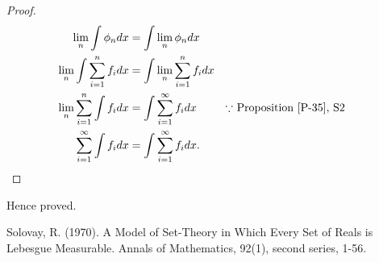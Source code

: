 \documentclass{article}
\theoremstyle{definition}
\theoremstyle{remark}
\theoremstyle{definition}
\theoremstyle{definition}
\theoremstyle{definition}
\begin{document}
\begin{proof}
	\begin{align*}
		\lim_n \int \phi_n dx &= \int \lim_{n}\phi_n dx\\
		\lim_{n} \int \sum_{i=1}^{n} f_i dx&= \int \lim_{n} \sum_{i=1}^{n} f_i dx\\
		\lim_{n}\sum_{i=1}^{n}\int f_i dx &= \int \sum_{i=1}^{\infty} f_i dx&&\text{$ \because $ Proposition \ref{P-35}, S2 }\\
		\sum_{i=1}^{\infty} \int f_i dx &= \int \sum_{i=1}^{\infty} f_i dx.
	\end{align*}
\end{proof}
Hence proved.

\hrulefill

\newpage
\begin{thebibliography}{9}
	Solovay, R. (1970). A Model of Set-Theory in Which Every Set of Reals is Lebesgue Measurable. Annals of Mathematics, 92(1), second series, 1-56.
\end{thebibliography}
\end{document}
